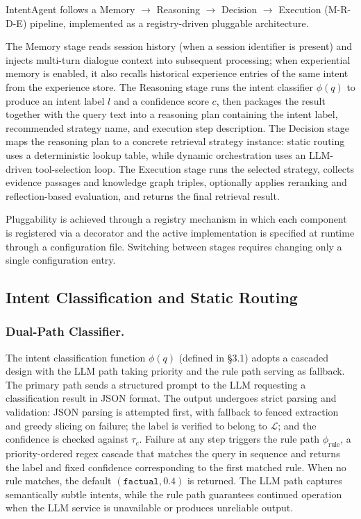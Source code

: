 \documentclass[runningheads]{llncs}
\begin{document}
IntentAgent follows a Memory $\to$ Reasoning $\to$ Decision $\to$ Execution (M-R-D-E) pipeline, implemented as a registry-driven pluggable architecture.

The Memory stage reads session history (when a session identifier is present) and injects multi-turn dialogue context into subsequent processing; when experiential memory is enabled, it also recalls historical experience entries of the same intent from the experience store. The Reasoning stage runs the intent classifier $\phi(q)$ to produce an intent label $l$ and a confidence score $c$, then packages the result together with the query text into a reasoning plan containing the intent label, recommended strategy name, and execution step description. The Decision stage maps the reasoning plan to a concrete retrieval strategy instance: static routing uses a deterministic lookup table, while dynamic orchestration uses an LLM-driven tool-selection loop. The Execution stage runs the selected strategy, collects evidence passages and knowledge graph triples, optionally applies reranking and reflection-based evaluation, and returns the final retrieval result.

Pluggability is achieved through a registry mechanism in which each component is registered via a decorator and the active implementation is specified at runtime through a configuration file. Switching between stages requires changing only a single configuration entry.

\subsection{Intent Classification and Static Routing}

\subsubsection{Dual-Path Classifier.}

The intent classification function $\phi(q)$ (defined in \S3.1) adopts a cascaded design with the LLM path taking priority and the rule path serving as fallback. The primary path sends a structured prompt to the LLM requesting a classification result in JSON format. The output undergoes strict parsing and validation: JSON parsing is attempted first, with fallback to fenced extraction and greedy slicing on failure; the label is verified to belong to $\mathcal{L}$; and the confidence is checked against $\tau_c$. Failure at any step triggers the rule path $\phi_{\text{rule}}$, a priority-ordered regex cascade that matches the query in sequence and returns the label and fixed confidence corresponding to the first matched rule. When no rule matches, the default $(\texttt{factual}, 0.4)$ is returned. The LLM path captures semantically subtle intents, while the rule path guarantees continued operation when the LLM service is unavailable or produces unreliable output.
\end{document}
